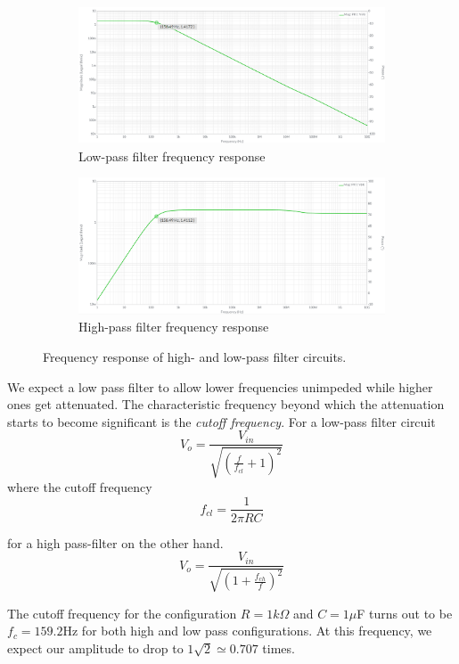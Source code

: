 \documentclass{article}
\begin{document}
	\begin{figure}[!h]
		\centering
		\begin{subfigure}{0.8\textwidth}
			\includegraphics[width=\textwidth]{low_pass_response}
			\caption{Low-pass filter frequency response}
		\end{subfigure}
		
		\begin{subfigure}{0.8\textwidth}
			\includegraphics[width=\textwidth]{high_pass_response}
			\caption{High-pass filter frequency response}
		\end{subfigure}
		\caption{Frequency response of high- and low-pass filter circuits.}
		\label{fig:high_low}
	\end{figure} 

	We expect a low pass filter to allow lower frequencies unimpeded while higher ones get attenuated. The characteristic frequency beyond which the attenuation starts to become significant is the {\it cutoff frequency}. For a low-pass filter circuit $$ V_o = \frac{V_{in}}{\sqrt{ \left( \frac{f}{f_{cl}} + 1  \right)^2}}$$ where the cutoff frequency $$f_{cl} = \frac{1}{2\pi RC}$$
	
	for a high pass-filter on the other hand.
	$$ V_o = \frac{V_{in}}{ \sqrt{\left( 1 + \frac{f_{ch}}{f}\right)^2} } $$
	
	The cutoff frequency for the configuration $R=1k\Omega$ and $C=1\mu$F turns out to be $f_c = 159.2 \mathrm{Hz}$ for both high and low pass configurations. At this frequency, we expect our amplitude to drop to $1\sqrt{2} \simeq 0.707$ times.
\end{document}
